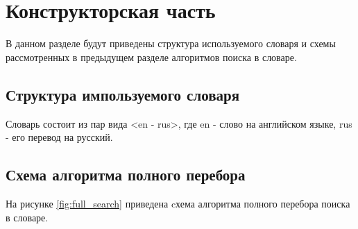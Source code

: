 \chapter{Конструкторская часть}

В данном разделе будут приведены структура используемого словаря и схемы рассмотренных в предыдущем разделе алгоритмов поиска в словаре.

\section{Структура импользуемого словаря}
Словарь состоит из пар вида <en - rus>, где en - слово на английском языке, rus - его перевод на русский.

\section{Схема алгоритма полного перебора}


На рисунке \ref{fig:full_search} приведена cхема алгоритма полного перебора поиска в словаре.

